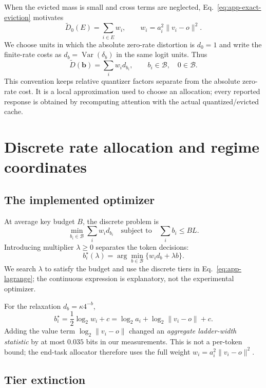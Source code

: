 When the evicted mass is small and cross terms are neglected,
Eq.~\eqref{eq:app-exact-eviction} motivates
\[
 \widetilde D_0(E)=\sum_{i\in E} w_i,
 \qquad
 w_i=a_i^2\|v_i-o\|^2.
\]
We choose units in which the absolute zero-rate distortion is $d_0=1$ and write
the finite-rate costs as $d_b=\operatorname{Var}(\delta_b)$ in the same logit
units.  Thus
\[
 \widetilde D(\mathbf b)=\sum_i w_i d_{b_i},
 \qquad b_i\in\mathcal B,\quad 0\in\mathcal B.
\]
This convention keeps relative quantizer factors separate from the absolute zero-rate
cost.  It is a local approximation used to choose an allocation; every
reported response is obtained by recomputing attention with the actual
quantized/evicted cache.

\section{Discrete rate allocation and regime coordinates}
\label{app:allocation}

\subsection{The implemented optimizer}

At average key budget $B$, the discrete problem is
\begin{equation}
 \min_{b_i\in\mathcal B}\sum_i w_i d_{b_i}
 \quad\text{subject to}\quad
 \sum_i b_i\le BL.
 \label{eq:app-discrete}
\end{equation}
Introducing multiplier $\lambda\ge0$ separates the token decisions:
\begin{equation}
 b_i^\star(\lambda)
 =\arg\min_{b\in\mathcal B}\{w_i d_b+\lambda b\}.
 \label{eq:app-lagrange}
\end{equation}
We search $\lambda$ to satisfy the budget and use the discrete tiers in
Eq.~\eqref{eq:app-lagrange}; the continuous expression is explanatory, not the
experimental optimizer.

For the relaxation $d_b=\kappa 4^{-b}$,
\[
 b_i^\star
 =\frac12\log_2w_i+c
 =\log_2a_i+\log_2\|v_i-o\|+c.
\]
Adding the value term $\log_2\|v_i-o\|$ changed an \emph{aggregate
ladder-width statistic} by at most $0.035$ bits in our measurements.  This is
not a per-token bound; the end-task allocator therefore uses the full weight
$w_i=a_i^2\|v_i-o\|^2$.

\subsection{Tier extinction}

